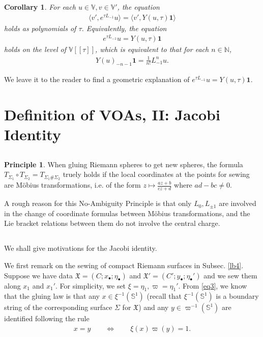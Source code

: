 \documentclass[11pt,b5paper,notitlepage]{article}
\theoremstyle{definition}
\newtheorem{prin}[df]{Principle}
\theoremstyle{plain}
\newtheorem{co}[df]{Corollary}
\newcommand{\fk}{\mathfrak}
\newcommand{\id}{\mathbf{1}}
\newcommand{\bigbk}[1]{\big\langle {#1}\big\rangle}
\newcommand{\blt}{\bullet}
\newcommand{\Vbb}{\mathbb V}
\newcommand{\Nbb}{\mathbb N}
\newcommand{\Sbb}{{\mathbb S}}
\numberwithin{equation}{section}
\begin{document}
\begin{co}\label{lb78}
For each $u\in\Vbb,v\in\Vbb'$, the equation
\begin{align*}
\bigbk{v',e^{\tau L_{-1}}u}=\bigbk{v',Y(u,\tau)\id}	
\end{align*}
holds as polynomials of $\tau$. Equivalently, the equation
\begin{align*}
e^{\tau L_{-1}}u=Y(u,\tau)\id	
\end{align*}
holds on the level of $\Vbb[[\tau]]$, which is equivalent to that for each $n\in\Nbb$,
\begin{align}
Y(u)_{-n-1}\id=\frac 1{n!}L_{-1}^n u.\label{eq52}	
\end{align}
\end{co}


We leave it to the reader to find a geometric explanation of  $e^{\tau L_{-1}}u=Y(u,\tau)\id$.




\section{Definition of VOAs, II: Jacobi Identity}


\subsection{}

\begin{prin}
When gluing Riemann spheres to get new spheres, the formula $T_{\Sigma_1}\circ T_{\Sigma_2}=T_{\Sigma_1\#\Sigma_2}$ truely holds if the local coordinates at the points for sewing are M\"obius transformations, i.e. of the form $z\mapsto \frac {az+b}{cz+d}$ where $ad-bc\neq0$.
\end{prin}


A rough reason for this No-Ambiguity Principle is that only $L_0,L_{\pm 1}$ are involved in the change of coordinate formulas between M\"obius transformations, and the Lie bracket relations between them do not involve the central charge.



\subsection{}\label{lb156}

We shall give motivations for the Jacobi identity. 


We first remark on the sewing of compact Riemann surfaces in Subsec. \ref{lb4}. Suppose we have data $\fk X=(C;x_\blt;\eta_\blt)$ and $\fk X'=(C';y_\blt;\eta_\blt')$ and we sew them along $x_1$ and $x_1'$. For simplicity, we set $\xi=\eta_1,\varpi=\eta_1'$. From \eqref{eq3}, we know that the gluing law is that any $x\in\xi^{-1}(\Sbb^1)$ (recall that $\xi^{-1}(\Sbb^1)$ is a boundary string of the corresponding surface $\Sigma$ for $\fk X$) and any $y\in\varpi^{-1}(\Sbb^1)$ are identified following the rule
\begin{align}
x=y\qquad \Longleftrightarrow\qquad\xi(x)\varpi(y)=1.\label{eq41}
\end{align}
\end{document}
